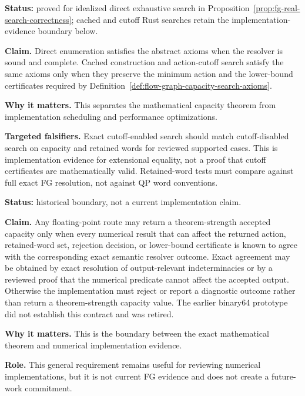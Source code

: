 \begin{unverified}
\begin{remark}%
\label{rem:fg-pr-concrete-search-axioms}
\textbf{Status:} proved for idealized direct exhaustive search in
Proposition~\ref{prop:fg-real-search-correctness}; cached and cutoff Rust
searches retain the implementation-evidence boundary below.

\textbf{Claim.}  Direct enumeration satisfies the abstract axioms when the
resolver is sound and complete.  Cached construction and action-cutoff search
satisfy the same axioms only when they preserve the minimum action and the
lower-bound certificates required by
Definition~\ref{def:flow-graph-capacity-search-axioms}.

\textbf{Why it matters.}  This separates the mathematical capacity theorem from
implementation scheduling and performance optimizations.

\textbf{Targeted falsifiers.}  Exact cutoff-enabled search should match
cutoff-disabled search on capacity and retained words for reviewed supported
cases.  This is implementation evidence for extensional equality, not a proof
that cutoff certificates are mathematically valid.  Retained-word tests must
compare against full exact FG resolution, not against QP word conventions.
\end{remark}
\end{unverified}

\begin{unverified}
\begin{remark}%
\label{rem:fg-pr-f64-accepted-output}
\textbf{Status:} historical boundary, not a current implementation claim.

\textbf{Claim.}  Any floating-point route may return a theorem-strength accepted
capacity only when every numerical result that can affect the returned action,
retained-word set, rejection decision, or lower-bound certificate is known to
agree with the corresponding exact semantic resolver outcome. Exact agreement
may be obtained by exact resolution of output-relevant indeterminacies or by a
reviewed proof that the numerical predicate cannot affect the accepted output.
Otherwise the implementation must reject or report a diagnostic outcome rather
than return a theorem-strength capacity value. The earlier binary64 prototype
did not establish this contract and was retired.

\textbf{Why it matters.}  This is the boundary between the exact mathematical
theorem and numerical implementation evidence.

\textbf{Role.} This general requirement remains useful for reviewing numerical
implementations, but it is not current FG evidence and does not create a
future-work commitment.
\end{remark}
\end{unverified}

